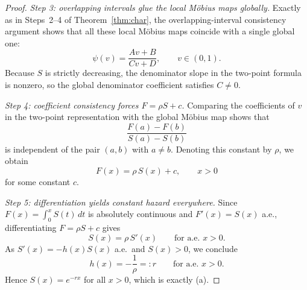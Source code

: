 \documentclass[10pt,a4paper]{amsart}
\begin{document}
\begin{proof}
\emph{Step 3: overlapping intervals glue the local M\"obius maps globally.}
Exactly as in Steps~2--4 of Theorem~\ref{thm:char}, the overlapping-interval
consistency argument shows that all these local M\"obius maps coincide with a
single global one:
\[
  \psi(v)=\frac{Av+B}{Cv+D},\qquad v\in(0,1).
\]
Because $S$ is strictly decreasing, the denominator slope in the two-point
formula is nonzero, so the global denominator coefficient satisfies $C\neq0$.

\emph{Step 4: coefficient consistency forces $F=\rho S + c$.}
Comparing the coefficients of $v$ in the two-point representation with the
global M\"obius map shows that
\[
  \frac{F(a)-F(b)}{S(a)-S(b)}
\]
is independent of the pair $(a,b)$ with $a\neq b$.  Denoting this constant by
$\rho$, we obtain
\[
  F(x)=\rho\,S(x)+c,\qquad x>0
\]
for some constant $c$.

\emph{Step 5: differentiation yields constant hazard everywhere.}
Since $F(x)=\int_0^x S(t)\,dt$ is absolutely continuous and
$F'(x)=S(x)$ a.e., differentiating $F=\rho S+c$ gives
\[
  S(x)=\rho\,S'(x)\qquad\text{for a.e.\ }x>0.
\]
As $S'(x)=-h(x)S(x)$ a.e.\ and $S(x)>0$, we conclude
\[
  h(x)=-\frac1\rho=:r
  \qquad\text{for a.e.\ }x>0.
\]
Hence $S(x)=e^{-rx}$ for all $x>0$, which is exactly (a).
\end{proof}
\end{document}
